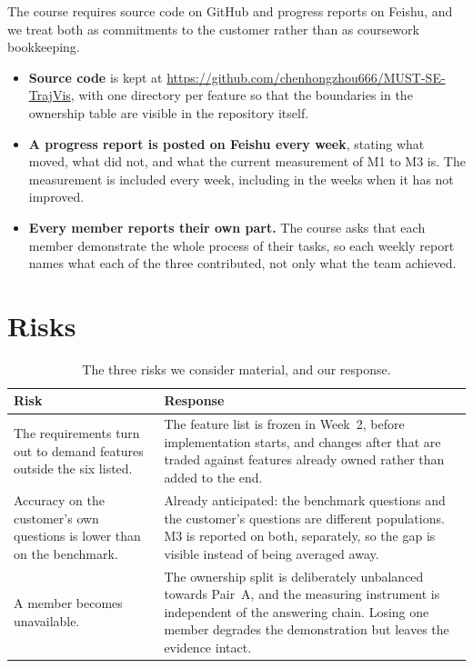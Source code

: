 \documentclass[12pt,a4paper]{report}
\begin{document}
The course requires source code on GitHub and progress reports on Feishu, and we
treat both as commitments to the customer rather than as coursework
bookkeeping.

\begin{itemize}
  \item \textbf{Source code} is kept at
    \url{https://github.com/chenhongzhou666/MUST-SE-TrajVis}, with one
    directory per feature so that the boundaries in the ownership table are
    visible in the repository itself.
  \item \textbf{A progress report is posted on Feishu every week}, stating what
    moved, what did not, and what the current measurement of M1 to M3 is. The
    measurement is included every week, including in the weeks when it has not
    improved.
  \item \textbf{Every member reports their own part.} The course asks that each
    member demonstrate the whole process of their tasks, so each weekly report
    names what each of the three contributed, not only what the team achieved.
\end{itemize}

\section{Risks}

\begin{table}[H]
  \centering
  \caption{The three risks we consider material, and our response.}
  \label{tab:risks}
  \begin{tabular}{@{}p{5.2cm}p{9.6cm}@{}}
    \toprule[1.5pt]
    \textbf{Risk} & \textbf{Response} \\
    \midrule
    The requirements turn out to demand features outside the six listed. &
      The feature list is frozen in Week~2, before implementation starts, and
      changes after that are traded against features already owned rather than
      added to the end. \\
    \addlinespace
    Accuracy on the customer's own questions is lower than on the benchmark. &
      Already anticipated: the benchmark questions and the customer's questions
      are different populations. M3 is reported on both, separately, so the gap
      is visible instead of being averaged away. \\
    \addlinespace
    A member becomes unavailable. &
      The ownership split is deliberately unbalanced towards Pair~A, and the
      measuring instrument is independent of the answering chain. Losing one
      member degrades the demonstration but leaves the evidence intact. \\
    \bottomrule[1.5pt]
  \end{tabular}
\end{table}
\end{document}
